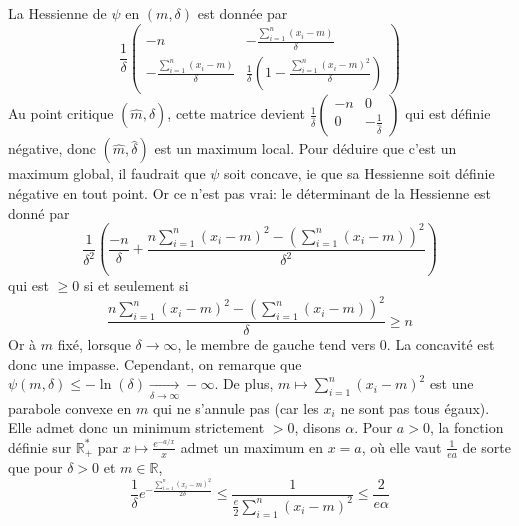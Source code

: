 \documentclass{report}
\begin{document}
La Hessienne de $\psi$ en $(m,\delta)$ est donnée par $$\frac{1}{\delta}\begin{pmatrix}
-n & -\frac{\sum_{i=1}^n (x_i-m)}{\delta} \\
-\frac{\sum_{i=1}^n (x_i-m)}{\delta} & \frac{1}{\delta} \left(1-\frac{\sum_{i=1}^n (x_i-m)^2}{\delta} \right)
\end{pmatrix}$$
Au point critique $(\hat m, \hat \delta)$, cette matrice devient $\frac{1}{\hat \delta} \begin{pmatrix}
-n & 0 \\
0 & -\frac{1}{\hat \delta}
\end{pmatrix}$ qui est définie négative, donc $(\hat m, \hat \delta)$ est un maximum local. \newline
Pour déduire que c'est un maximum global, il faudrait que $\psi$ soit concave, ie que sa Hessienne soit définie négative en tout point. Or ce n'est pas vrai: le déterminant de la Hessienne est donné par $$\frac{1}{\delta^2}\left(\frac{-n}{\delta} + \frac{n \sum_{i=1}^n (x_i-m)^2 - \left(\sum_{i=1}^n(x_i-m) \right)^2}{\delta^2}\right)$$ qui est $\geq 0$ si et seulement si $$\frac{n \sum_{i=1}^n (x_i-m)^2 - \left(\sum_{i=1}^n(x_i-m) \right)^2}{\delta}\geq n$$
Or à $m$ fixé, lorsque $\delta \to \infty$, le membre de gauche tend vers $0$.\newline
\newline
La concavité est donc une impasse.\newline
Cependant, on remarque que $\psi(m,\delta)\leq -\ln(\delta) \xrightarrow[\delta \to \infty]{}-\infty$. \newline
De plus, $m\mapsto \sum_{i=1}^n (x_i-m)^2$ est une parabole convexe en $m$ qui ne s'annule pas (car les $x_i$ ne sont pas tous égaux). Elle admet donc un minimum strictement $>0$, disons $\alpha$. Pour $a>0$, la fonction définie sur $\mathbb R_+^*$ par $x\mapsto \frac{e^{-a/x}}{x}$ admet un maximum en $x=a$, où elle vaut $\frac{1}{ea}$ de sorte que pour $\delta>0$ et $m\in \mathbb R$, $$\frac{1}{\delta} e^{-\frac{\sum_{i=1}^n (x_i-m)^2}{2\delta}}\leq \frac{1}{\frac e2 \sum_{i=1}^n (x_i-m)^2 } \leq \frac{2}{e\alpha }$$
\end{document}
